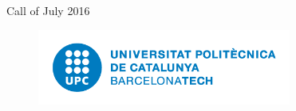 \begin{titlepage}


{\large Call of July 2016}\\[3cm] %


 

\begin{figure}[h]
  \centering
     \includegraphics[height=2.5cm]{Img/upc_logos/UPC-positiu-p3005.png}
\end{figure}

\vspace*{\fill} %

\end{titlepage}
